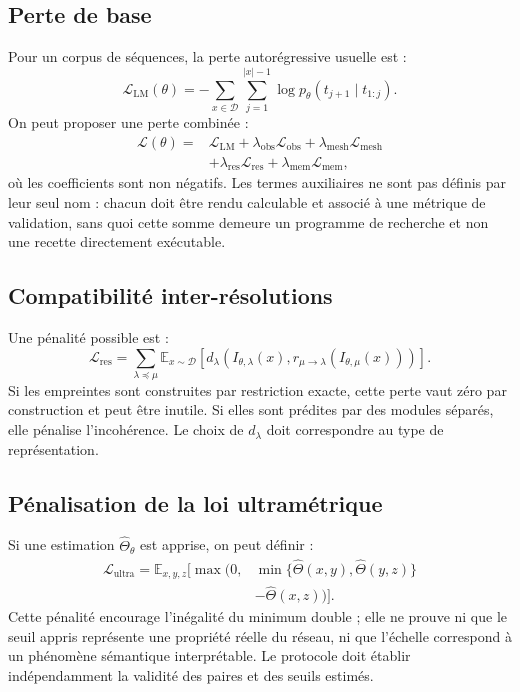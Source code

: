 \documentclass[11pt,a4paper]{article}
\theoremstyle{remark}
\newcommand{\D}{\mathcal D}
\newcommand{\E}{\mathbb E}
\newcommand{\1}{\mathbf 1}
\begin{document}
\subsection{Perte de base}
Pour un corpus de séquences, la perte autorégressive usuelle est :
\[
\mathcal L_{\mathrm{LM}}(\theta)=-\sum_{x\in\D}\sum_{j=1}^{|x|-1}
\log p_\theta(t_{j+1}\mid t_{1:j}).
\]
On peut proposer une perte combinée :
\[
\begin{aligned}
\mathcal L(\theta)= {}&\mathcal L_{\mathrm{LM}}+\lambda_{\mathrm{obs}}\mathcal L_{\mathrm{obs}}
+\lambda_{\mathrm{mesh}}\mathcal L_{\mathrm{mesh}}\\
&+\lambda_{\mathrm{res}}\mathcal L_{\mathrm{res}}
+\lambda_{\mathrm{mem}}\mathcal L_{\mathrm{mem}},
\end{aligned}
\]
où les coefficients sont non négatifs. Les termes auxiliaires ne sont pas définis par leur seul nom : chacun doit être rendu calculable et associé à une métrique de validation, sans quoi cette somme demeure un programme de recherche et non une recette directement exécutable.

\subsection{Compatibilité inter-résolutions}
Une pénalité possible est :
\[
\mathcal L_{\mathrm{res}}=\sum_{\lambda\preceq\mu}\E_{x\sim\D}\left[
 d_\lambda\left(I_{\theta,\lambda}(x),r_{\mu\to\lambda}(I_{\theta,\mu}(x))\right)\right].
\]
Si les empreintes sont construites par restriction exacte, cette perte vaut zéro par construction et peut être inutile. Si elles sont prédites par des modules séparés, elle pénalise l'incohérence. Le choix de $d_\lambda$ doit correspondre au type de représentation.

\subsection{Pénalisation de la loi ultramétrique}
Si une estimation $\widehat{\Theta}_\theta$ est apprise, on peut définir :
\[
\begin{aligned}
\mathcal L_{\mathrm{ultra}}=\E_{x,y,z}\bigl[\max(0,&\min\{\widehat\Theta(x,y),\widehat\Theta(y,z)\}\\
&-\widehat\Theta(x,z))\bigr].
\end{aligned}
\]
Cette pénalité encourage l'inégalité du minimum double ; elle ne prouve ni que le seuil appris représente une propriété réelle du réseau, ni que l'échelle correspond à un phénomène sémantique interprétable. Le protocole doit établir indépendamment la validité des paires et des seuils estimés.
\end{document}
